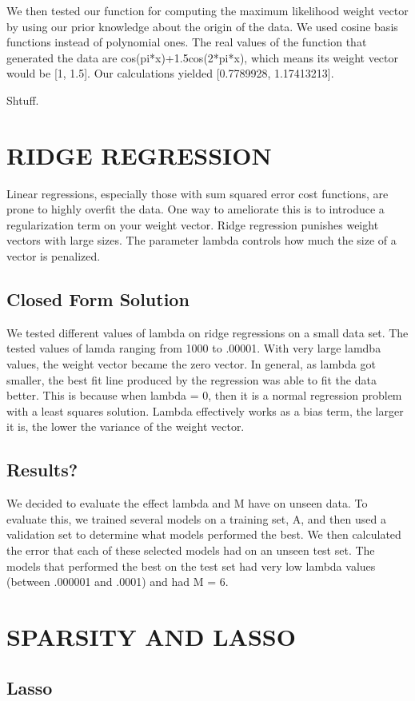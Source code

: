 \documentclass[a4paper,twoside]{article}
\begin{document}
We then tested our function for computing the maximum likelihood weight vector by using our prior knowledge about the origin of the data. We used cosine basis functions instead of polynomial ones. The real values of the function that generated the data are cos(pi*x)+1.5cos(2*pi*x), which means its weight vector would be [1, 1.5]. Our calculations yielded [0.7789928, 1.17413213]. 

Shtuff.


\section{\uppercase{Ridge Regression}}

Linear regressions, especially those with sum squared error cost functions, are prone to highly overfit the data. One way to ameliorate this is to introduce a regularization term on your weight vector. Ridge regression punishes weight vectors with large sizes. The parameter lambda controls how much the size of a vector is penalized. 

\subsection{Closed Form Solution}

We tested different values of lambda on ridge regressions on a small data set. The tested values of lamda ranging from 1000 to .00001. With very large lamdba values, the weight vector became the zero vector. In general, as lambda got smaller, the best fit line produced by the regression was able to fit the data better. This is because when lambda = 0, then it is a normal regression problem with a least squares solution. Lambda effectively works as a bias term, the larger it is, the lower the variance of the weight vector. 

\subsection{Results?}

We decided to evaluate the effect lambda and M have on unseen data. To evaluate this, we trained several models on a training set, A, and then used a validation set to determine what models performed the best. We then calculated the error that each of these selected models had on an unseen test set. The models that performed the best on the test set had very low lambda values (between .000001 and .0001) and had M = 6. 


\section{\uppercase{Sparsity and LASSO}}

\subsection{Lasso}



\vfill
\end{document}
